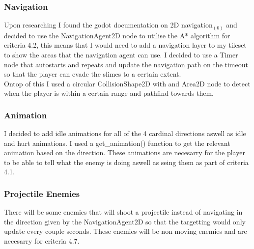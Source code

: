 \documentclass{article}
\begin{document}
        \subsubsection{Navigation}
        Upon researching I found the godot documentation on 2D navigation$_{(6)}$ and decided to use the NavigationAgent2D node to utilise the A* algorithm for criteria 4.2, this means that I would need to add a navigation layer to my tileset to show the areas that the navigation agent can use. I decided to use a Timer node that autostarts and repeats and update the navigation path on the timeout so that the player can evade the slimes to a certain extent.\\
        Ontop of this I used a circular CollisionShape2D with and Area2D node to detect when the player is within a certain range and pathfind towards them.\\
        \subsubsection{Animation}
        I decided to add idle animations for all of the 4 cardinal directions aswell as idle and hurt animations. I used a get\_animation() function to get the relevant animation based on the direction. These animations are necesarry for the player to be able to tell what the enemy is doing aswell as seing them as part of criteria 4.1.\\
        \subsubsection{Projectile Enemies}
        There will be some enemies that will shoot a projectile instead of navigating in the direction given by the NavigationAgent2D so that the targetting would only update every couple seconds. These enemies will be non moving enemies and are necesarry for criteria 4.7.\\
\end{document}
